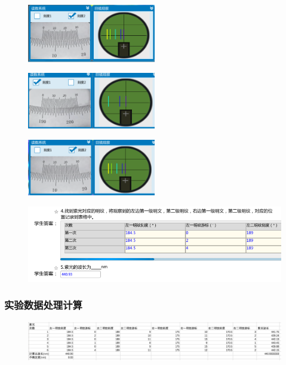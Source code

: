 \documentclass{article}
\begin{document}
    \begin{figure}[H]
        \centering
        \includegraphics[width=0.5\textwidth]{16.png}
        \end{figure}
        \begin{figure}[H]
            \centering
            \includegraphics[width=0.5\textwidth]{17.png}
            \end{figure}

            \begin{figure}[H]
                \centering
                \includegraphics[width=0.5\textwidth]{18.png}
                \end{figure}
                
                \begin{figure}[H]
                    \centering
                    \includegraphics[width=1\textwidth]{32.png}
                    \end{figure}
    
\subsubsection*{实验数据处理计算}
\begin{figure}[H]
    \centering
    \includegraphics[width=1\textwidth]{8.png}
    \end{figure}
\end{document}
